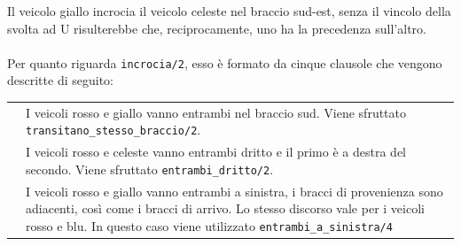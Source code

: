 Il veicolo giallo incrocia il veicolo celeste nel braccio sud-est, senza il vincolo della svolta ad U risulterebbe che, reciprocamente, uno ha la precedenza sull'altro.
\\\\
\indent Per quanto riguarda \texttt{incrocia/2}, esso è formato da cinque clausole che vengono descritte di seguito:
\begin{center}
	\begin{longtabu} to \textwidth {lX}
		 & I veicoli rosso e giallo vanno entrambi nel braccio sud. Viene sfruttato \texttt{transitano\_stesso\_braccio/2}.\\
		
		 & I veicoli rosso e celeste vanno entrambi dritto e il primo è a destra del secondo. Viene sfruttato \texttt{entrambi\_dritto/2}.\\
		
		 & I veicoli rosso e giallo vanno entrambi a sinistra, i bracci di provenienza sono adiacenti, così come i bracci di arrivo.   Lo stesso discorso vale per i veicoli rosso e blu. In questo caso viene utilizzato \texttt{entrambi\_a\_sinistra/4}\\
		

\end{longtabu}
\end{center}
